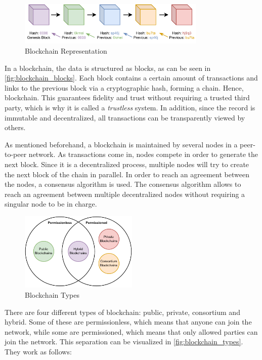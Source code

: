 \begin{figure}[h]
    \centering
    \includegraphics[width=0.8\textwidth]{graphics/blockchain.pdf}
    \caption{Blockchain Representation}
    \label{fig:blockchain_blocks}
\end{figure}

In a blockchain, the data is structured as blocks, as can be seen in \autoref{fig:blockchain_blocks}. Each block contains a certain amount of transactions and links to the previous block via a cryptographic hash, forming a chain. Hence, blockchain. This guarantees fidelity and trust without requiring a trusted third party, which is why it is called a \textit{trustless} system. In addition, since the record is immutable and decentralized, all transactions can be transparently viewed by others.

As mentioned beforehand, a blockchain is maintained by several nodes in a peer-to-peer network. As transactions come in, nodes compete in order to generate the next block. Since it is a decentralized process, multiple nodes will try to create the next block of the chain in parallel. In order to reach an agreement between the nodes, a consensus algorithm is used. The consensus algorithm allows to reach an agreement between multiple decentralized nodes without requiring a singular node to be in charge.

\begin{figure}[h]
    \centering
    \includegraphics[width=0.5\textwidth]{graphics/blockchain-types.pdf}
    \caption{Blockchain Types}
    \label{fig:blockchain_types}
\end{figure}

There are four different types of blockchain: public, private, consortium and hybrid. Some of these are permissionless, which means that anyone can join the network, while some are permissioned, which means that only allowed parties can join the network. This separation can be visualized in \autoref{fig:blockchain_types}. They work as follows:

